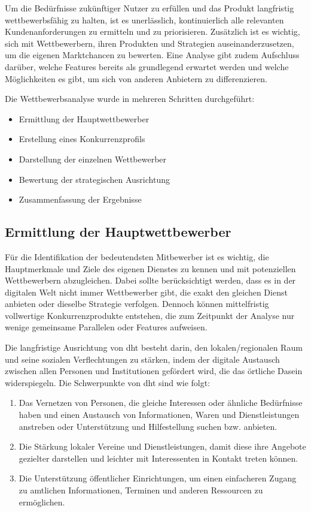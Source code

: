 \label{sec:Wettbewerbsanalyse}

Um die Bedürfnisse zukünftiger Nutzer zu erfüllen und das Produkt langfristig wettbewerbsfähig zu halten, ist es unerlässlich, kontinuierlich alle relevanten Kundenanforderungen zu ermitteln und zu priorisieren. Zusätzlich ist es wichtig, sich mit Wettbewerbern, ihren Produkten und Strategien auseinanderzusetzen, um die eigenen Marktchancen zu bewerten. Eine Analyse gibt zudem Aufschluss darüber, welche Features bereits als grundlegend erwartet werden und welche Möglichkeiten es gibt, um sich von anderen Anbietern zu differenzieren.


Die Wettbewerbsanalyse wurde in mehreren Schritten durchgeführt:

\begin{itemize}
    \item Ermittlung der Hauptwettbewerber
    \item Erstellung eines Konkurrenzprofils
    \item Darstellung der einzelnen Wettbewerber
    \item Bewertung der strategischen Ausrichtung
    \item Zusammenfassung der Ergebnisse
\end{itemize}

\subsection{Ermittlung der Hauptwettbewerber}

Für die Identifikation der bedeutendsten Mitbewerber ist es wichtig, die Hauptmerkmale und Ziele des eigenen Dienstes zu kennen und mit potenziellen Wettbewerbern abzugleichen. Dabei sollte berücksichtigt werden, dass es in der digitalen Welt nicht immer Wettbewerber gibt, die exakt den gleichen Dienst anbieten oder dieselbe Strategie verfolgen. Dennoch können mittelfristig vollwertige Konkurrenzprodukte entstehen, die zum Zeitpunkt der Analyse nur wenige gemeinsame Parallelen oder Features aufweisen.

Die langfristige Ausrichtung von \acrfull{dht} besteht darin, den lokalen/regionalen Raum und seine sozialen Verflechtungen zu stärken, indem der digitale Austausch zwischen allen Personen und Institutionen gefördert wird, die das örtliche Dasein widerspiegeln. Die Schwerpunkte von \acrshort{dht} sind wie folgt:

\begin{enumerate}
    \item Das Vernetzen von Personen, die gleiche Interessen oder ähnliche Bedürfnisse haben und einen Austausch von Informationen, Waren und Dienstleistungen anstreben oder Unterstützung und Hilfestellung suchen bzw. anbieten.
    \item Die Stärkung lokaler Vereine und Dienstleistungen, damit diese ihre Angebote gezielter darstellen und leichter mit Interessenten in Kontakt treten können.
    \item Die Unterstützung öffentlicher Einrichtungen, um einen einfacheren Zugang zu amtlichen Informationen, Terminen und anderen Ressourcen zu ermöglichen.
\end{enumerate}

